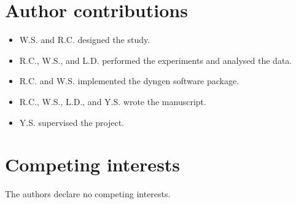 \documentclass[10pt, a4paper]{article}
\begin{document}
\hypertarget{author-contributions}{%
	\section*{Author contributions}\label{author-contributions}}

\begin{itemize}
	\item
	W.S. and R.C. designed the study.
	\item
	R.C., W.S., and L.D. performed the experiments and analysed the data.
	\item
	R.C. and W.S. implemented the dyngen software package.
	\item
	R.C., W.S., L.D., and Y.S. wrote the manuscript.
	\item
	Y.S. supervised the project.
\end{itemize}

\hypertarget{competing-interests}{%
	\section*{Competing interests}\label{competing-interests}}

The authors declare no competing interests.

%
%
\end{document}
